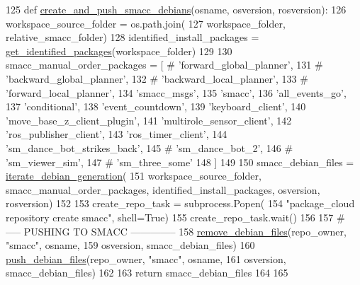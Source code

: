 \begin{DoxyCode}
125 \textcolor{keyword}{def }\hyperlink{namespacegenerate__debs_af7237c463c8e5b4df369e6befc154c50}{create\_and\_push\_smacc\_debians}(osname, osversion, rosversion):
126     workspace\_source\_folder = os.path.join(
127         workspace\_folder, relative\_smacc\_folder)
128     identified\_install\_packages = \hyperlink{namespacegenerate__debs_aa91b87c6d9c3ed04015845cc9298431a}{get\_identified\_packages}(workspace\_folder)
129 
130     smacc\_manual\_order\_packages = [  \textcolor{comment}{# 'forward\_global\_planner',}
131         \textcolor{comment}{# 'backward\_global\_planner',}
132         \textcolor{comment}{# 'backward\_local\_planner',}
133         \textcolor{comment}{# 'forward\_local\_planner',}
134         \textcolor{stringliteral}{'smacc\_msgs'},
135         \textcolor{stringliteral}{'smacc'},
136         \textcolor{stringliteral}{'all\_events\_go'},
137         \textcolor{stringliteral}{'conditional'},
138         \textcolor{stringliteral}{'event\_countdown'},
139         \textcolor{stringliteral}{'keyboard\_client'},
140         \textcolor{stringliteral}{'move\_base\_z\_client\_plugin'},
141         \textcolor{stringliteral}{'multirole\_sensor\_client'},
142         \textcolor{stringliteral}{'ros\_publisher\_client'},
143         \textcolor{stringliteral}{'ros\_timer\_client'},
144         \textcolor{stringliteral}{'sm\_dance\_bot\_strikes\_back'},
145         \textcolor{comment}{#        'sm\_dance\_bot\_2',}
146         \textcolor{comment}{#        'sm\_viewer\_sim',}
147         \textcolor{comment}{#        'sm\_three\_some'}
148     ]
149 
150     smacc\_debian\_files = \hyperlink{namespacegenerate__debs_a2615a6fc7860b6aa9e920e6b4d886589}{iterate\_debian\_generation}(
151         workspace\_source\_folder, smacc\_manual\_order\_packages, identified\_install\_packages, osversion, 
      rosversion)
152 
153     create\_repo\_task = subprocess.Popen(
154         \textcolor{stringliteral}{"package\_cloud repository create smacc"}, shell=\textcolor{keyword}{True})
155     create\_repo\_task.wait()
156 
157     \textcolor{comment}{# ----- PUSHING TO SMACC --------------}
158     \hyperlink{namespacegenerate__debs_a08095040d038b3613ad0e77fd4e7f60e}{remove\_debian\_files}(repo\_owner, \textcolor{stringliteral}{"smacc"},  osname,
159                         osversion, smacc\_debian\_files)
160     \hyperlink{namespacegenerate__debs_a9b22f5ad65b40b7903c467eda308e575}{push\_debian\_files}(repo\_owner, \textcolor{stringliteral}{"smacc"},  osname,
161                       osversion, smacc\_debian\_files)
162 
163     \textcolor{keywordflow}{return} smacc\_debian\_files
164 
165 
\end{DoxyCode}


